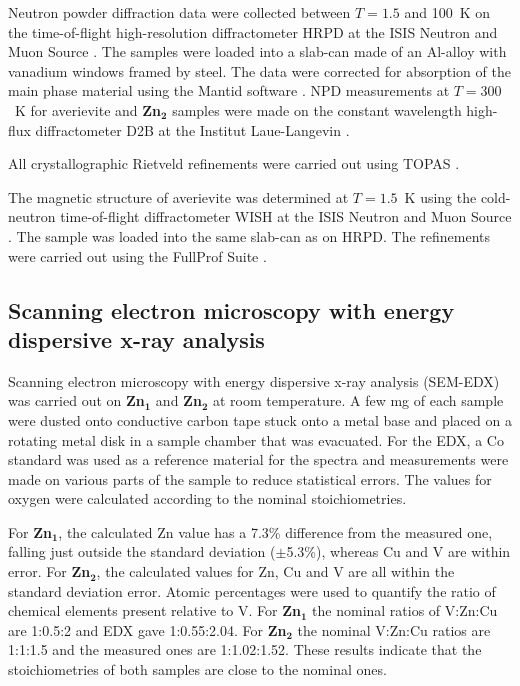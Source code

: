 \documentclass[
sn-nature,
Numbered,
iicol]
{sn-jnl}%
\begin{document}
Neutron powder diffraction data were collected between $T=1.5$ and 100~K on the time-of-flight high-resolution diffractometer HRPD at the ISIS Neutron and Muon Source \cite{HRPD_avv}. The samples were loaded into a slab-can made of an Al-alloy with vanadium windows framed by steel. 
The data were corrected for absorption of the main phase material using the Mantid software \cite{Mantid}. 
NPD measurements at $T=300$~K for averievite and {\bf Zn$\mathbf {_2}$} samples were made on the constant wavelength high-flux diffractometer D2B at the Institut Laue-Langevin \cite{D2B_avv}. 

All crystallographic Rietveld refinements were carried out using TOPAS \cite{Topasv7}.

The magnetic structure of averievite was determined at $T=1.5$~K using the cold-neutron time-of-flight diffractometer WISH at the ISIS Neutron and Muon Source \cite{WISH_avv}. The sample was loaded into the same slab-can as on HRPD. The refinements were carried out using the FullProf Suite \cite{Fullprof}. 



\subsection*{Scanning electron microscopy with energy dispersive x-ray analysis}

Scanning electron microscopy with energy dispersive x-ray analysis (SEM-EDX) was carried out on {\bf Zn$\mathbf {_1}$} and {\bf Zn$\mathbf {_2}$} at room temperature.
A few mg of each sample were dusted onto conductive carbon tape stuck onto a metal base and placed on a rotating metal disk in a sample chamber that was evacuated. 
For the EDX, a Co standard was used as a reference material for the spectra and measurements were made on various parts of the sample to reduce statistical errors. 
The values for oxygen were calculated according to the nominal stoichiometries. 

For {\bf Zn$\mathbf {_1}$}, the calculated Zn value has a 7.3\% difference from the measured one, falling just outside the standard deviation ($\pm$5.3\%), whereas Cu and V are within error. For {\bf Zn$\mathbf {_2}$}, the calculated values for Zn, Cu and V are all within the standard deviation error. Atomic percentages were used to quantify the ratio of chemical elements present relative to V. For {\bf Zn$\mathbf {_1}$} the nominal ratios of V:Zn:Cu are 1:0.5:2 and EDX gave 1:0.55:2.04. For {\bf Zn$\mathbf {_2}$} the nominal V:Zn:Cu ratios are 1:1:1.5 and the measured ones are 1:1.02:1.52. These results indicate that the stoichiometries of both samples are close to the nominal ones.
\end{document}
